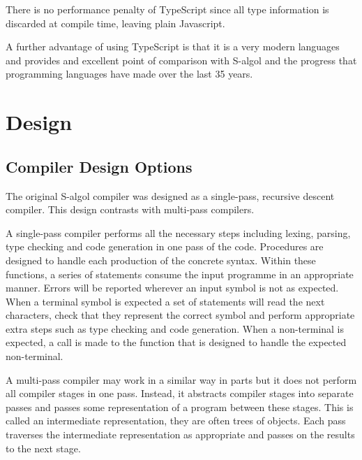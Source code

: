 \documentclass{article}
\begin{document}
There is no performance penalty of TypeScript since all type information is discarded at compile time, leaving plain Javascript.

A further advantage of using TypeScript is that it is a very modern languages and provides and excellent point of comparison with S-algol and the progress that programming languages have made over the last 35 years. 
\section{Design}


\subsection{Compiler Design Options}

The original S-algol compiler was designed as a single-pass, recursive descent compiler. This design contrasts with multi-pass compilers.

A single-pass compiler performs all the necessary steps including lexing, parsing, type checking and code generation in one pass of the code. Procedures are designed to handle each production of the concrete syntax. Within these functions, a series of statements consume the input programme in an appropriate manner. Errors will be reported wherever an input symbol is not as expected. When a terminal symbol is expected a set of statements will read the next characters, check that they represent the correct symbol and perform appropriate extra steps such as type checking and code generation. When a non-terminal is expected, a call is made to the function that is designed to handle the expected non-terminal.

A multi-pass compiler may work in a similar way in parts but it does not perform all compiler stages in one pass. Instead, it abstracts compiler stages into separate passes and passes some representation of a program between these stages. This is called an intermediate representation, they are often trees of objects. Each pass traverses the intermediate representation as appropriate and passes on the results to the next stage.
\end{document}

